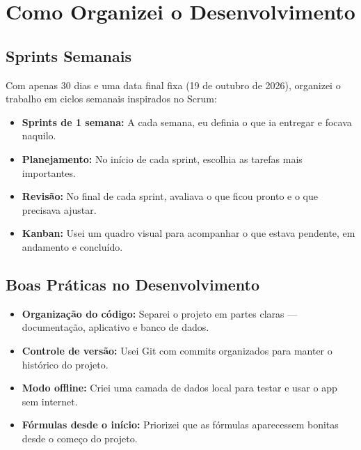 \documentclass[12pt, a4paper]{article}
\begin{document}
\section{Como Organizei o Desenvolvimento}

\subsection{Sprints Semanais}

Com apenas 30 dias e uma data final fixa (19 de outubro de 2026), organizei o trabalho em ciclos semanais inspirados no Scrum:

\begin{itemize}[leftmargin=2cm]
  \item \textbf{Sprints de 1 semana:} A cada semana, eu definia o que ia entregar e focava naquilo.
  \item \textbf{Planejamento:} No in\'{i}cio de cada sprint, escolhia as tarefas mais importantes.
  \item \textbf{Revis\~{a}o:} No final de cada sprint, avaliava o que ficou pronto e o que precisava ajustar.
  \item \textbf{Kanban:} Usei um quadro visual para acompanhar o que estava pendente, em andamento e conclu\'{i}do.
\end{itemize}

\subsection{Boas Pr\'{a}ticas no Desenvolvimento}

\begin{itemize}[leftmargin=2cm]
  \item \textbf{Organiza\c{c}\~{a}o do c\'{o}digo:} Separei o projeto em partes claras --- documenta\c{c}\~{a}o, aplicativo e banco de dados.
  \item \textbf{Controle de vers\~{a}o:} Usei Git com commits organizados para manter o hist\'{o}rico do projeto.
  \item \textbf{Modo offline:} Criei uma camada de dados local para testar e usar o app sem internet.
  \item \textbf{F\'{o}rmulas desde o in\'{i}cio:} Priorizei que as f\'{o}rmulas aparecessem bonitas desde o come\c{c}o do projeto.
\end{itemize}
\end{document}
